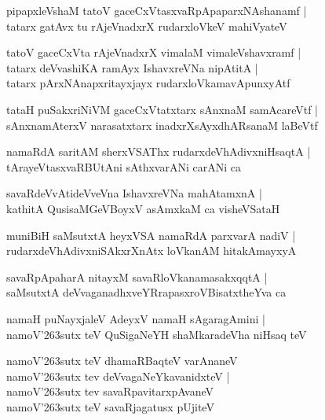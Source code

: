 \documentclass[twoside,12pt,openright]{book}
\def\S{\char'263}
\newcounter{shloka}[chapter]
\begin{document}
\begin{shloka}
pipapxleVshaM tatoV gaceCxVtasxvaRpApaparxNAshanamf |\\
tatarx gatAvx tu rAjeVnadxrX rudarxloVkeV mahiVyateV 
\end{shloka}

\begin{shloka}
tatoV gaceCxVta rAjeVnadxrX vimalaM vimaleVshavxramf |\\
tatarx deVvashiKA ramAyx IshavxreVNa nipAtitA |\\
tatarx pArxNAnapxritayxjayx rudarxloVkamavApunxyAtf
\end{shloka}

\begin{shloka}
tataH puSakxriNiVM gaceCxVtatxtarx sAnxnaM samAcareVtf |\\
sAnxnamAterxV narasatxtarx inadxrXsAyxdhARsanaM laBeVtf
\end{shloka}

\begin{shloka}
namaRdA saritAM sherxVSAThx rudarxdeVhAdivxniHsaqtA |\\
tArayeVtasxvaRBUtAni sAthxvarANi carANi ca
\end{shloka}

\begin{shloka}
savaRdeVvAtideVveVna IshavxreVNa mahAtamxnA |\\
kathitA QusisaMGeVBoyxV asAmxkaM ca visheVSataH 
\end{shloka}

\begin{shloka}
muniBiH saMsutxtA heyxVSA namaRdA parxvarA nadiV |\\
rudarxdeVhAdivxniSAkxrXnAtx loVkanAM hitakAmayxyA 
\end{shloka}

\begin{shloka}
savaRpApaharA nitayxM savaRloVkanamasakxqqtA |\\
saMsutxtA deVvaganadhxveYRrapasxroVBisatxtheYva ca
\end{shloka}

\begin{shloka}
namaH puNayxjaleV AdeyxV namaH sAgaragAmini |\\
namoV\S sutx teV QuSigaNeYH shaMkaradeVha niHsaq teV
\end{shloka}

\begin{shloka}
namoV\S sutx teV dhamaRBaqteV varAnaneV \\
namoV\S sutx tev deVvagaNeYkavanidxteV |\\
namoV\S sutx tev savaRpavitarxpAvaneV \\
namoV\S sutx teV savaRjagatusx pUjiteV 
\end{shloka}
\end{document}
